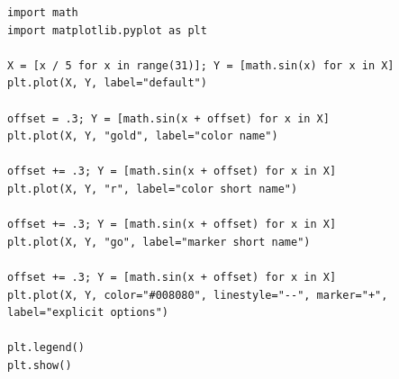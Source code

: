 
\begin{frame}[fragile]
%
\vspace{-5pt}
\begin{codebox}
\begin{verbatim}
import math
import matplotlib.pyplot as plt

X = [x / 5 for x in range(31)]; Y = [math.sin(x) for x in X]
plt.plot(X, Y, label="default")

offset = .3; Y = [math.sin(x + offset) for x in X]
plt.plot(X, Y, "gold", label="color name")

offset += .3; Y = [math.sin(x + offset) for x in X]
plt.plot(X, Y, "r", label="color short name")

offset += .3; Y = [math.sin(x + offset) for x in X]
plt.plot(X, Y, "go", label="marker short name")

offset += .3; Y = [math.sin(x + offset) for x in X]
plt.plot(X, Y, color="#008080", linestyle="--", marker="+", label="explicit options")

plt.legend()
plt.show()
\end{verbatim}
\end{codebox}
%
\end{frame}


